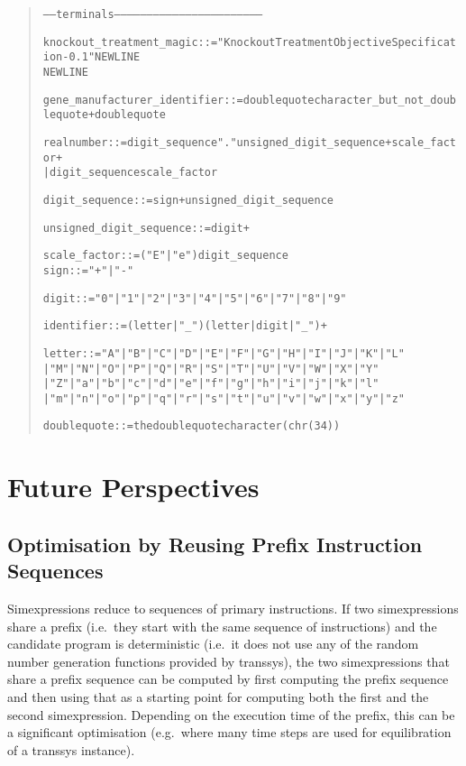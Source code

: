 \documentclass[a4paper,fleqn]{article}
\newenvironment{ebnfrule}{\begin{footnotesize}\begin{quote}\begin{alltt}}{\end{alltt}\end{quote}\end{footnotesize}}
\begin{document}
\begin{ebnfrule}
----- terminals --------------------------------------------------------------------

knockout_treatment_magic ::= "KnockoutTreatmentObjectiveSpecification-0.1" NEWLINE
NEWLINE

gene_manufacturer_identifier ::= doublequote character_but_not_doublequote+ doublequote

realnumber ::= digit_sequence "." unsigned_digit_sequence+ scale_factor+
                | digit_sequence scale_factor

digit_sequence ::= sign+ unsigned_digit_sequence

unsigned_digit_sequence ::= digit+


scale_factor ::= ("E" | "e") digit_sequence
sign ::=  "+" | "-"


digit ::= "0" | "1" | "2" | "3" | "4" | "5" | "6" | "7" | "8" | "9"

identifier ::= (letter | "_") (letter | digit | "_")+

letter ::= "A" | "B" | "C" | "D" | "E" | "F" | "G" | "H" | "I" | "J" | "K"| "L" 
| "M" | "N" | "O" | "P" | "Q" | "R" | "S" | "T" | "U" | "V" | "W"| "X" | "Y" 
| "Z"| "a" | "b" | "c" | "d" | "e" | "f" | "g" | "h" | "i" | "j" | "k"| "l" 
| "m" | "n" | "o" | "p" | "q" | "r" | "s" | "t" | "u" | "v" | "w" | "x" | "y" | "z"

doublequote ::= the doublequote character (chr(34))
\end{ebnfrule}




\section{Future Perspectives}

\subsection{Optimisation by Reusing Prefix Instruction Sequences}

Simexpressions reduce to sequences of primary instructions. If two
simexpressions share a prefix (i.e.\ they start with the same sequence
of instructions) and the candidate program is deterministic (i.e.\ it
does not use any of the random number generation functions provided by
transsys), the two simexpressions that share a prefix sequence can be
computed by first computing the prefix sequence and then using that as
a starting point for computing both the first and the second
simexpression. Depending on the execution time of the prefix, this can
be a significant optimisation (e.g.\ where many time steps are used
for equilibration of a transsys instance).
\end{document}
